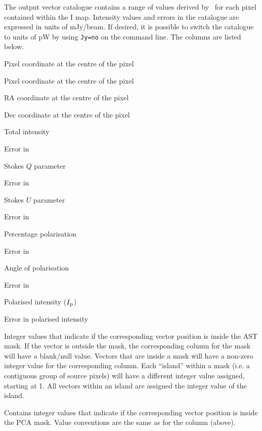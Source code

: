 The output vector catalogue contains a range of values derived by
\poltwomap\ for each pixel contained within the I map. Intensity values and
errors in the
catalogue are expressed in units of mJy/beam.  If desired, it is possible
to switch the catalogue to units of pW by using \texttt{Jy=no} on the 
command line.  The columns are listed below.

\begin{aligndesc}
\item[\catcol{X}] Pixel coordinate at the centre of the pixel
\item[\catcol{Y}] Pixel coordinate at the centre of the pixel
\item[\catcol{RA}] RA coordinate at the centre of the pixel
\item[\catcol{Dec}] Dec coordinate at the centre of the pixel
\item[\catcol{I}] Total intensity
\item[\catcol{DI}] Error in 
\item[\catcol{Q}] Stokes $Q$ parameter
\item[\catcol{DQ}] Error in 
\item[\catcol{U}] Stokes $U$ parameter
\item[\catcol{DU}] Error in 
\item[\catcol{P}] Percentage polarisation
\item[\catcol{DP}] Error in 
\item[\catcol{ANG}] Angle of polarisation
\item[\catcol{DANG}] Error in 
\item[\catcol{PI}] Polarised intensity ($I_{\textnormal{p}}$)
\item[\catcol{DPI}] Error in polarised intensity
\item[\catcol{AST}] Integer values that indicate if the corresponding vector position is inside the AST mask. If the vector is outside the mask, the corresponding column for the mask will have a blank/null value. Vectors that are inside a mask will have a non-zero integer value for the corresponding column. Each ``island'' within a mask (i.e. a contiguous group of source pixels) will have a different integer value assigned, starting at 1. All vectors within an island are assigned the integer value of the island. 
\item[\catcol{PCA}] Contains integer values that indicate if the corresponding vector position is inside the PCA mask. Value conventions are the same as for the  column (above).
\end{aligndesc}


